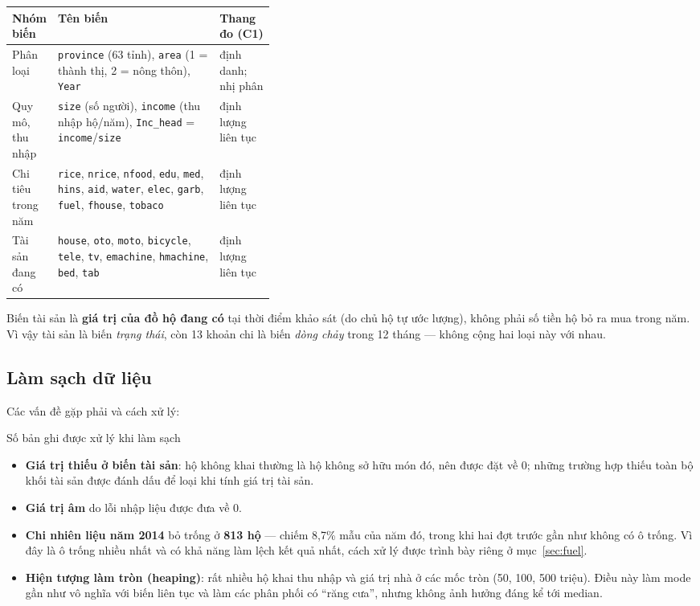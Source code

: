 \documentclass[11pt,a4paper]{article}
\newcommand{\n}[1]{\textbf{#1}}
\newcommand{\tbl}[1]{}
\begin{document}
\begin{center}\small
\begin{tabularx}{\linewidth}{@{}p{0.17\linewidth}Xp{0.21\linewidth}@{}}
\toprule
\textbf{Nhóm biến} & \textbf{Tên biến} & \textbf{Thang đo (C1)}\\
\midrule
Phân loại & \texttt{province} (63 tỉnh), \texttt{area} (1 = thành thị, 2 = nông thôn), \texttt{Year} & định danh; nhị phân\\
Quy mô, thu nhập & \texttt{size} (số người), \texttt{income} (thu nhập hộ/năm), \texttt{Inc\_head} = \texttt{income}/\texttt{size} & định lượng liên tục\\
Chi tiêu trong năm & \texttt{rice}, \texttt{nrice}, \texttt{nfood}, \texttt{edu}, \texttt{med}, \texttt{hins}, \texttt{aid}, \texttt{water}, \texttt{elec}, \texttt{garb}, \texttt{fuel}, \texttt{fhouse}, \texttt{tobaco} & định lượng liên tục\\
Tài sản đang có & \texttt{house}, \texttt{oto}, \texttt{moto}, \texttt{bicycle}, \texttt{tele}, \texttt{tv}, \texttt{emachine}, \texttt{hmachine}, \texttt{bed}, \texttt{tab} & định lượng liên tục\\
\bottomrule
\end{tabularx}
\end{center}

\begin{pp}
Biến tài sản là \n{giá trị của đồ hộ đang có} tại thời điểm khảo sát (do chủ hộ tự ước lượng), không phải số tiền hộ bỏ ra mua trong năm. Vì vậy tài sản là biến \emph{trạng thái}, còn 13 khoản chi là biến \emph{dòng chảy} trong 12 tháng — không cộng hai loại này với nhau.
\end{pp}

\subsection{Làm sạch dữ liệu}
Các vấn đề gặp phải và cách xử lý:

\begin{table}[H]\centering\small
\caption{Số bản ghi được xử lý khi làm sạch}
\tbl{t_clean}
\end{table}

\begin{itemize}[leftmargin=1.2em,itemsep=2pt,topsep=2pt]
\item \n{Giá trị thiếu ở biến tài sản}: hộ không khai thường là hộ không sở hữu món đó, nên được đặt về 0; những trường hợp thiếu toàn bộ khối tài sản được đánh dấu để loại khi tính giá trị tài sản.
\item \n{Giá trị âm} do lỗi nhập liệu được đưa về 0.
\item \n{Chi nhiên liệu năm 2014} bỏ trống ở \n{813 hộ} — chiếm 8,7\% mẫu của năm đó, trong khi hai đợt trước gần như không có ô trống. Vì đây là ô trống nhiều nhất và có khả năng làm lệch kết quả nhất, cách xử lý được trình bày riêng ở mục~\ref{sec:fuel}.
\item \n{Hiện tượng làm tròn (heaping)}: rất nhiều hộ khai thu nhập và giá trị nhà ở các mốc tròn (50, 100, 500 triệu). Điều này làm mode gần như vô nghĩa với biến liên tục và làm các phân phối có “răng cưa”, nhưng không ảnh hưởng đáng kể tới median.
\end{itemize}
\end{document}
